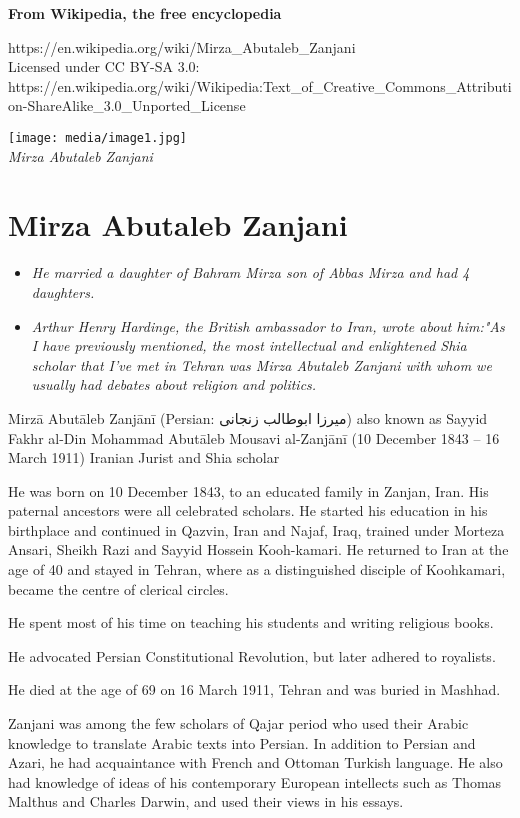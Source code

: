 \textbf{From Wikipedia, the free encyclopedia}

https://en.wikipedia.org/wiki/Mirza\_Abutaleb\_Zanjani\\
Licensed under CC BY-SA 3.0:\\
https://en.wikipedia.org/wiki/Wikipedia:Text\_of\_Creative\_Commons\_Attribution-ShareAlike\_3.0\_Unported\_License

\texttt{[image: media/image1.jpg]}\\
\emph{Mirza Abutaleb Zanjani}

\section{Mirza Abutaleb Zanjani}\label{mirza-abutaleb-zanjani}

\begin{itemize}
\item
  \emph{He married a daughter of Bahram Mirza son of Abbas Mirza and had
  4 daughters.}
\item
  \emph{Arthur Henry Hardinge, the British ambassador to Iran, wrote
  about him:"As I have previously mentioned, the most intellectual and
  enlightened Shia scholar that I've met in Tehran was Mirza Abutaleb
  Zanjani with whom we usually had debates about religion and politics.}
\end{itemize}

Mirzā Abutāleb Zanjānī (Persian: میرزا ابوطالب زنجانی‎) also known as
Sayyid Fakhr al-Din Mohammad Abutāleb Mousavi al-Zanjānī (10 December
1843 -- 16 March 1911) Iranian Jurist and Shia scholar

He was born on 10 December 1843, to an educated family in Zanjan, Iran.
His paternal ancestors were all celebrated scholars. He started his
education in his birthplace and continued in Qazvin, Iran and Najaf,
Iraq, trained under Morteza Ansari, Sheikh Razi and Sayyid Hossein
Kooh-kamari. He returned to Iran at the age of 40 and stayed in Tehran,
where as a distinguished disciple of Koohkamari, became the centre of
clerical circles.

He spent most of his time on teaching his students and writing religious
books.

He advocated Persian Constitutional Revolution, but later adhered to
royalists.

He died at the age of 69 on 16 March 1911, Tehran and was buried in
Mashhad.

Zanjani was among the few scholars of Qajar period who used their Arabic
knowledge to translate Arabic texts into Persian. In addition to Persian
and Azari, he had acquaintance with French and Ottoman Turkish language.
He also had knowledge of ideas of his contemporary European intellects
such as Thomas Malthus and Charles Darwin, and used their views in his
essays.

